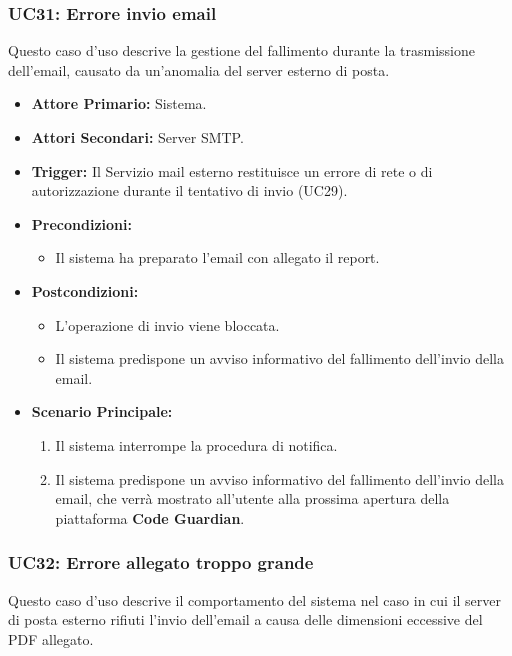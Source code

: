 \documentclass[12pt, a4paper]{article}
\begin{document}
\subsubsection{UC31: Errore invio email}\label{uc:31}
Questo caso d'uso descrive la gestione del fallimento durante la trasmissione dell'email, causato da un'anomalia del server esterno di posta.

\begin{itemize}
    \item \textbf{Attore Primario:} Sistema.
    \item \textbf{Attori Secondari:} Server SMTP.
    \item \textbf{Trigger:} Il Servizio mail esterno restituisce un errore di rete o di autorizzazione durante il tentativo di invio (UC29).
    \item \textbf{Precondizioni:}
    \begin{itemize}
        \item Il sistema ha preparato l'email con allegato il report.
    \end{itemize}
    \item \textbf{Postcondizioni:}
    \begin{itemize}
        \item L'operazione di invio viene bloccata.
        \item Il sistema predispone un avviso informativo del fallimento dell'invio della email.
    \end{itemize}
    \item \textbf{Scenario Principale:}
    \begin{enumerate}
        \item Il sistema interrompe la procedura di notifica.
        \item Il sistema predispone un avviso informativo del fallimento dell'invio della email, che verrà mostrato all'utente alla prossima apertura della piattaforma \textbf{Code Guardian}.
    \end{enumerate}
\end{itemize}

\subsubsection{UC32: Errore allegato troppo grande}\label{uc:32}
Questo caso d'uso descrive il comportamento del sistema nel caso in cui il server di posta esterno rifiuti l'invio dell'email a causa delle dimensioni eccessive del PDF allegato.
\end{document}
